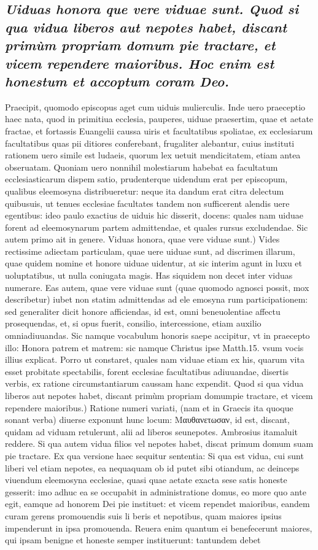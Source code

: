 \documentclass{article}
\begin{document}
\begin{pages}
\subsection*{\textit{Uiduas honora que vere viduae sunt. Quod si qua vidua liberos aut nepotes habet, discant primùm propriam domum pie tractare, et vicem rependere maioribus. Hoc enim est honestum et accoptum coram Deo. }}\pstart Praecipit, quomodo episcopus aget cum uiduis mulierculis. Inde uero praeceptio haec nata, quod in primitiua ecclesia, pauperes, uiduae praesertim, quae et aetate fractae, et fortassis Euangelii caussa uiris et facultatibus spoliatae, ex ecclesiarum facultatibus quas pii ditiores conferebant, frugaliter alebantur, cuius instituti rationem uero simile est ludaeis, quorum lex uetuit mendicitatem, etiam antea obseruatam. Quoniam uero nonnihil molestiarum habebat ea facultatum ecclesiasticarum dispem satio, prudenterque uidendum erat per episcopum, qualibus eleemosyna distribueretur: neque ita dandum erat citra delectum quibusuis, ut tenues ecclesiae facultates tandem non sufficerent alendis uere egentibus: ideo paulo exactius de uiduis hic disserit, docens: quales nam uiduae forent ad eleemosynarum partem admittendae, et quales rursus excludendae. Sic autem primo ait in genere.  \pend\pstart Viduas honora, quae vere viduae sunt.) Vides rectissime adiectam particulam, quae uere uiduae sunt, ad discrimen illarum, quae quidem nomine et honore uiduae uidentur, at sic interim agunt in luxu et uoluptatibus, ut nulla coniugata magis. Has siquidem non decet inter viduas numerare. Eas autem, quae vere viduae sunt (quae quomodo agnosci possit, mox describetur) iubet non statim admittendas ad ele emosyna rum participationem: sed generaliter dicit honore afficiendas, id est, omni beneuolentiae affectu prosequendas, et, si opus fuerit, consilio, intercessione, etiam auxilio omniadiuuandas. Sic namque vocabulum honoris saepe accipitur, vt in praecepto illo: Honora patrem et matrem: sic namque Christus ipse Matth.15. vsum vocis illius explicat. Porro ut constaret, quales nam viduae etiam ex his, quarum vita esset probitate spectabilis, forent ecclesiae facultatibus adiuuandae, disertis verbis, ex ratione circumstantiarum caussam hanc expendit.  \pend\pstart Quod si qua vidua liberos aut nepotes habet, discant primùm propriam domumpie tractare, et vicem rependere maioribus.) Ratione numeri variati, (nam et in Graecis ita quoque sonant verba) diuerse exponunt hunc locum: Μαυθανετωσαν, id est, discant, quidam ad viduam retulerunt, alii ad liberos seunepotes. Ambrosius itamaluit reddere. Si qua autem vidua filios vel nepotes habet, discat primum domum suam pie tractare. Ex qua versione haec sequitur sententia: Si qua est vidua, cui sunt liberi vel etiam nepotes, ea nequaquam ob id putet sibi otiandum, ac deinceps viuendum eleemosyna ecclesiae, quasi quae aetate exacta sese satis honeste gesserit: imo adhuc ea se occupabit in administratione domus, eo more quo ante egit, eamque ad honorem Dei pie instituet: et vicem rependet maioribus, eandem curam gerens promouendis suis li beris et nepotibus, quam maiores ipsius impenderunt in ipsa promouenda. Reuera enim quantum ei benefecerunt maiores, qui ipsam benigne et honeste semper instituerunt: tantundem debet 
\end{pages}
\end{document}
